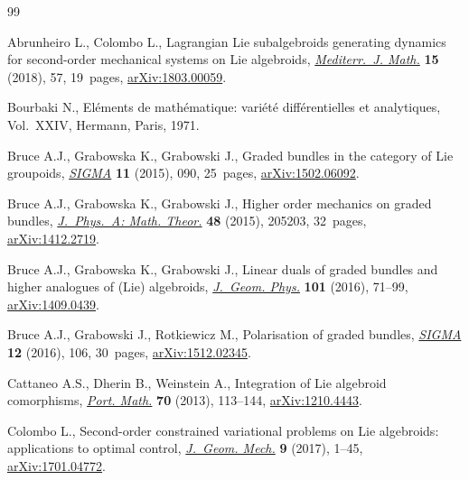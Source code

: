 \begin{thebibliography}{99}
\footnotesize\itemsep=0pt

Abrunheiro L., Colombo L., Lagrangian {L}ie subalgebroids generating dynamics
 for second-order mechanical systems on {L}ie algebroids, \href{https://doi.org/10.1007/s00009-018-1108-x}{\textit{Mediterr.~J.
 Math.}} \textbf{15} (2018), 57, 19~pages, \href{https://arxiv.org/abs/1803.00059}{arXiv:1803.00059}.

Bourbaki N., El\'ements de math\'ematique: vari\'et\'e diff\'erentielles et
 analytiques, Vol.~XXIV, Hermann, Paris, 1971.

Bruce A.J., Grabowska K., Grabowski J., Graded bundles in the category of {L}ie
 groupoids, \href{https://doi.org/10.3842/SIGMA.2015.090}{\textit{SIGMA}} \textbf{11} (2015), 090, 25~pages,
 \href{https://arxiv.org/abs/1502.06092}{arXiv:1502.06092}.

Bruce A.J., Grabowska K., Grabowski J., Higher order mechanics on graded
 bundles, \href{https://doi.org/10.1088/1751-8113/48/20/205203}{\textit{J.~Phys.~A: Math. Theor.}} \textbf{48} (2015), 205203,
 32~pages, \href{https://arxiv.org/abs/1412.2719}{arXiv:1412.2719}.

Bruce A.J., Grabowska K., Grabowski J., Linear duals of graded bundles and
 higher analogues of ({L}ie) algebroids, \href{https://doi.org/10.1016/j.geomphys.2015.12.004}{\textit{J.~Geom. Phys.}} \textbf{101}
 (2016), 71--99, \href{https://arxiv.org/abs/1409.0439}{arXiv:1409.0439}.

Bruce A.J., Grabowski J., Rotkiewicz M., Polarisation of graded bundles,
 \href{https://doi.org/10.3842/SIGMA.2016.106}{\textit{SIGMA}} \textbf{12} (2016), 106, 30~pages, \href{https://arxiv.org/abs/1512.02345}{arXiv:1512.02345}.

Cattaneo A.S., Dherin B., Weinstein A., Integration of {L}ie algebroid
 comorphisms, \href{https://doi.org/10.4171/PM/1928}{\textit{Port. Math.}} \textbf{70} (2013), 113--144,
 \href{https://arxiv.org/abs/1210.4443}{arXiv:1210.4443}.

Colombo L., Second-order constrained variational problems on {L}ie algebroids:
 applications to optimal control, \href{https://doi.org/10.3934/jgm.2017001}{\textit{J.~Geom. Mech.}} \textbf{9} (2017),
 1--45, \href{https://arxiv.org/abs/1701.04772}{arXiv:1701.04772}.


\end{thebibliography}
